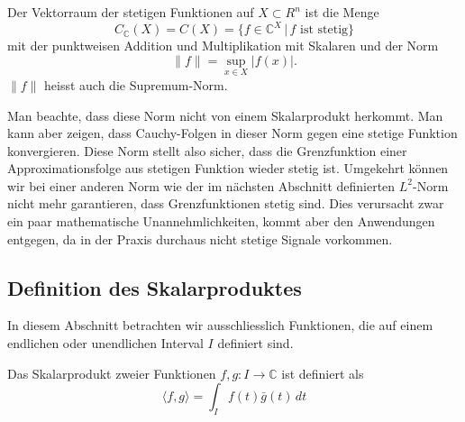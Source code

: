 \begin{definition}
Der Vektorraum der stetigen Funktionen auf $X\subset R^n$ ist die Menge
\[
C_{\mathbb C}(X)
=
C(X)
=
\{ f\in \mathbb C^X\,|\, \text{$f$ ist stetig}\}
\]
mit der punktweisen Addition und Multiplikation mit Skalaren und der
Norm
\[
\| f \| = \sup_{x\in X} |f(x)|.
\]
$\|f\|$ heisst auch die Supremum-Norm.
\end{definition}

Man beachte, dass diese Norm nicht von einem Skalarprodukt herkommt.
Man kann aber zeigen, dass Cauchy-Folgen in dieser Norm gegen eine
stetige Funktion konvergieren.
Diese Norm stellt also sicher, dass die Grenzfunktion einer
Approximationsfolge aus stetigen Funktion wieder stetig ist.
Umgekehrt können wir bei einer anderen Norm wie der im nächsten
Abschnitt definierten $L^2$-Norm nicht mehr garantieren, dass 
Grenzfunktionen stetig sind.
Dies verursacht zwar ein paar mathematische Unannehmlichkeiten,
kommt aber den Anwendungen entgegen, da in der Praxis durchaus
nicht stetige Signale vorkommen.

\subsection{Definition des Skalarproduktes}
In diesem Abschnitt betrachten wir ausschliesslich Funktionen, die auf
einem endlichen oder unendlichen Interval $I$ definiert sind.

\begin{definition}
Das Skalarprodukt zweier Funktionen $f,g\colon I\to\mathbb C$ ist definiert
als
\[
\langle f,g\rangle
=
\int_I f(t) \bar{g}(t)\,dt
\]
\end{definition}

